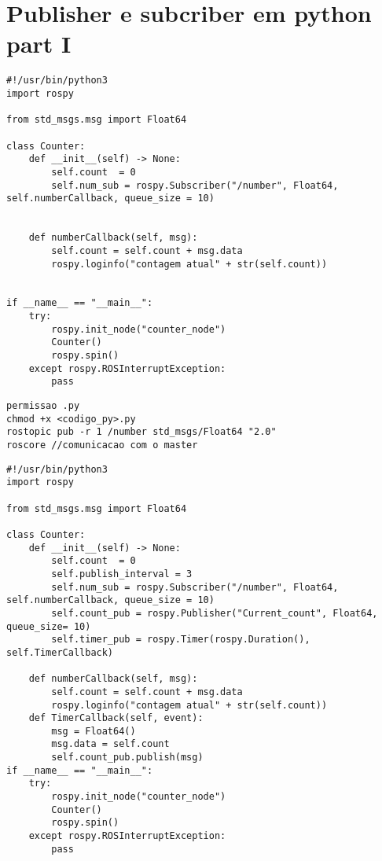 \documentclass[letterpaper]{article}
\begin{document}
\section{Publisher e subcriber em python part I}
\begin{lstlisting}[style=pythonStyle, title= counter.py ] 
#!/usr/bin/python3
import rospy

from std_msgs.msg import Float64

class Counter:
    def __init__(self) -> None:
        self.count  = 0
        self.num_sub = rospy.Subscriber("/number", Float64, self.numberCallback, queue_size = 10)


    def numberCallback(self, msg):
        self.count = self.count + msg.data
        rospy.loginfo("contagem atual" + str(self.count))


if __name__ == "__main__":
    try:
        rospy.init_node("counter_node")
        Counter()
        rospy.spin()
    except rospy.ROSInterruptException:
        pass    
\end{lstlisting}
\begin{lstlisting}[style=bashstyle, title=Ros terminal]
permissao .py
chmod +x <codigo_py>.py
rostopic pub -r 1 /number std_msgs/Float64 "2.0" 
roscore //comunicacao com o master
\end{lstlisting}
\begin{lstlisting}[style=pythonstyle, title=counter.py- with publish] 
#!/usr/bin/python3
import rospy

from std_msgs.msg import Float64

class Counter:
    def __init__(self) -> None:
        self.count  = 0
        self.publish_interval = 3
        self.num_sub = rospy.Subscriber("/number", Float64, self.numberCallback, queue_size = 10)
        self.count_pub = rospy.Publisher("Current_count", Float64, queue_size= 10)
        self.timer_pub = rospy.Timer(rospy.Duration(), self.TimerCallback)

    def numberCallback(self, msg):
        self.count = self.count + msg.data
        rospy.loginfo("contagem atual" + str(self.count))
    def TimerCallback(self, event):
        msg = Float64()
        msg.data = self.count
        self.count_pub.publish(msg)
if __name__ == "__main__":
    try:
        rospy.init_node("counter_node")
        Counter()
        rospy.spin()
    except rospy.ROSInterruptException:
        pass    
\end{lstlisting}
\end{document}
